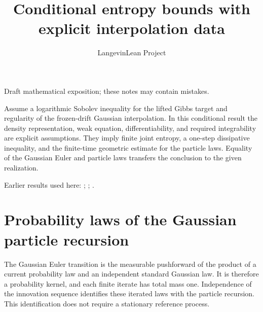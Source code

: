 \documentclass[11pt,a4paper]{article}
\title{\texorpdfstring{Conditional entropy bounds with explicit interpolation data}{Conditional entropy bounds with explicit interpolation data}}
\author{LangevinLean Project}
\date{}
\begin{document}
\maketitle
Draft mathematical exposition; these notes may contain mistakes.


Assume a logarithmic Sobolev inequality for the lifted Gibbs target and regularity of the frozen-drift Gaussian interpolation. In this conditional result the density representation, weak equation, differentiability, and required integrability are explicit assumptions. They imply finite joint entropy, a one-step dissipative inequality, and the finite-time geometric estimate for the particle laws. Equality of the Gaussian Euler and particle laws transfers the conclusion to the given realization.




Earlier results used here: \cite[Section~3.16]{LangevinLean2026IPLA}; \cite[Section~3.5]{LangevinLean2026IPLA}; \cite[Section~3.34]{LangevinLean2026ULALSI}.

\section{\texorpdfstring{Probability laws of the Gaussian particle recursion}{Probability laws of the Gaussian particle recursion}}


The Gaussian Euler transition is the measurable pushforward of the product of a current probability law and an independent standard Gaussian law. It is therefore a probability kernel, and each finite iterate has total mass one. Independence of the innovation sequence identifies these iterated laws with the particle recursion. This identification does not require a stationary reference process.
\end{document}
